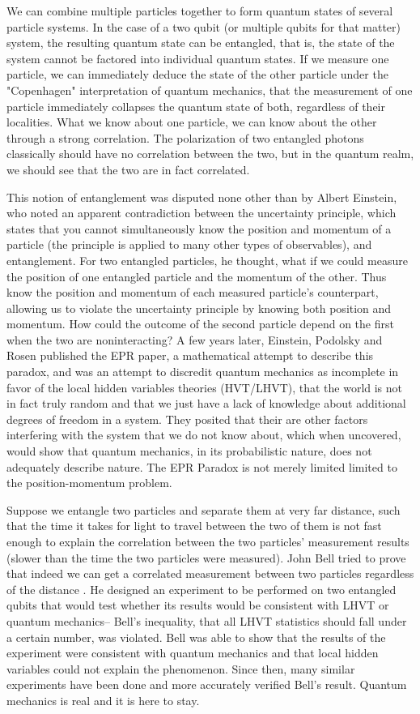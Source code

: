 \documentclass{article}
\begin{document}
    We can combine multiple particles together to form quantum states of several particle systems. In the case of a two qubit (or multiple qubits for that matter) system, the resulting quantum state can be entangled, that is, the state of the system cannot be factored into individual quantum states. If we measure one particle, we can immediately deduce the state of the other particle under the "Copenhagen" interpretation of quantum mechanics, that the measurement of one particle immediately collapses the quantum state of both, regardless of their localities. What we know about one particle, we can know about the other through a strong correlation. The polarization of two entangled photons classically should have no correlation between the two, but in the quantum realm, we should see that the two are in fact correlated. 
    
    This notion of entanglement was disputed none other than by Albert Einstein, who noted an apparent contradiction between the uncertainty principle, which states that you cannot simultaneously know the position and momentum of a particle (the principle is applied to many other types of observables), and entanglement. For two entangled particles, he thought, what if we could measure the position of one entangled particle and the momentum of the other. Thus know the position and momentum of each measured particle's counterpart, allowing us to violate the uncertainty principle by knowing both position and momentum. How could the outcome of the second particle depend on the first when the two are noninteracting? A few years later, Einstein, Podolsky and Rosen \cite{deh} \cite{bell} published the EPR paper, a mathematical attempt to describe this paradox, and was an attempt to discredit quantum mechanics as incomplete in favor of the local hidden variables theories (HVT/LHVT), that the world is not in fact truly random and that we just have a lack of knowledge about additional degrees of freedom in a system. They posited that their are other factors interfering with the system that we do not know about, which when uncovered, would show that quantum mechanics, in its probabilistic nature, does not adequately describe nature. The EPR Paradox is not merely limited limited to the position-momentum problem.
    
    Suppose we entangle two particles and separate them at very far distance, such that the time it takes for light to travel between the two of them is not fast enough to explain the correlation between the two particles' measurement results (slower than the time the two particles were measured). John Bell tried to prove that indeed we can get a correlated measurement between two particles regardless of the distance \cite{bell}\cite{deh}. He designed an experiment to be performed on two entangled qubits that would test whether its results would be consistent with LHVT or quantum mechanics– Bell's inequality, that all LHVT statistics should fall under a certain number, was violated. Bell was able to show that the results of the experiment were consistent with quantum mechanics and that local hidden variables could not explain the phenomenon. Since then, many similar experiments have been done and more accurately verified Bell's result. Quantum mechanics is real and it is here to stay.
    
\end{document}
